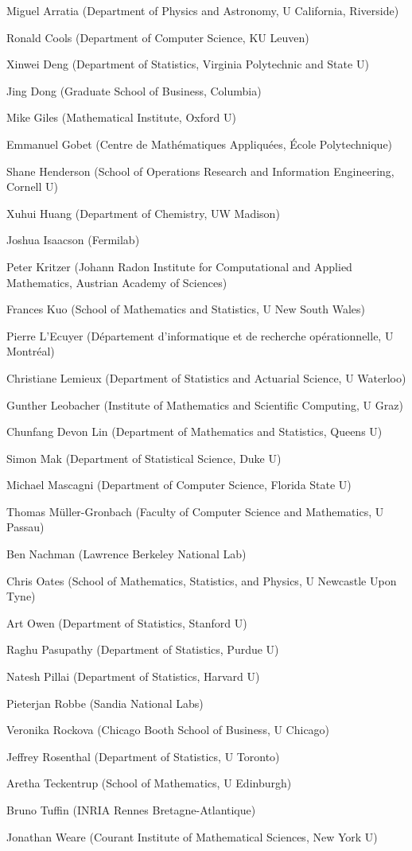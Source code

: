 \setlength{\columnsep}{1cm}
\begin{multicols}{2}
\raggedright
Miguel Arratia (Department of Physics and Astronomy, U California, Riverside)

Ronald Cools (Department of Computer Science, KU Leuven)

Xinwei Deng (Department of Statistics, Virginia Polytechnic and State U)

Jing Dong (Graduate School of Business, Columbia)

Mike Giles (Mathematical Institute, Oxford U)

Emmanuel Gobet (Centre de Mathématiques Appliquées, École Polytechnique)

Shane Henderson (School of Operations Research and Information Engineering, Cornell U)

Xuhui Huang (Department of Chemistry, UW Madison)

Joshua Isaacson (Fermilab)

Peter Kritzer (Johann Radon Institute for Computational and Applied Mathematics, Austrian Academy of Sciences)

Frances Kuo (School of Mathematics and Statistics, U New South Wales)

Pierre L'Ecuyer (Département d'informatique et de recherche opérationnelle, U Montréal)

Christiane Lemieux (Department of Statistics and Actuarial Science, U Waterloo)

Gunther Leobacher (Institute of Mathematics and Scientific Computing, U Graz)

Chunfang Devon Lin (Department of Mathematics and Statistics, Queens U)

Simon Mak (Department of Statistical Science, Duke U)

Michael Mascagni (Department of Computer Science, Florida State U)

Thomas Müller-Gronbach (Faculty of Computer Science and Mathematics, U Passau)

Ben Nachman (Lawrence Berkeley National Lab)

Chris Oates (School of Mathematics, Statistics, and Physics, U Newcastle Upon Tyne)

Art Owen (Department of Statistics, Stanford U)

Raghu Pasupathy (Department of Statistics, Purdue U)

Natesh Pillai (Department of Statistics, Harvard U)

Pieterjan Robbe (Sandia National Labs)

Veronika Rockova (Chicago Booth School of Business, U Chicago)

Jeffrey Rosenthal (Department of Statistics, U Toronto)

Aretha Teckentrup (School of Mathematics, U Edinburgh)

Bruno Tuffin (INRIA Rennes Bretagne-Atlantique)

Jonathan Weare (Courant Institute of Mathematical Sciences, New York U)

\end{multicols}


